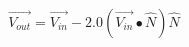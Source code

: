 \begin{equation}
 \begin{aligned}
 \vec{V_{out}} = \vec{V_{in}} - 2.0(\vec{V_{in}}\bullet\hat{N})\hat{N}\label{eqn:bound002} 
\end{aligned}
\end{equation}
